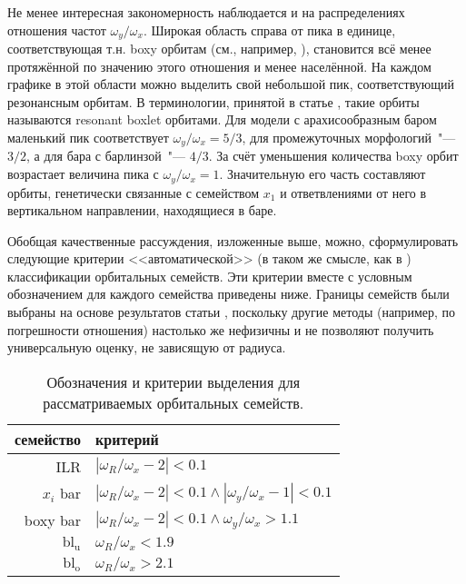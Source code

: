 \documentclass[tikz]{trlnotes}
\begin{document}
Не менее интересная закономерность наблюдается и на распределениях отношения частот $ω_y/ω_x$. Широкая область справа от пика в единице,
соответствующая т.н. boxy орбитам (см., например, \citealp{valluri2016}), становится всё менее протяжённой по значению этого отношения и менее населённой. На каждом графике в этой области
можно выделить свой небольшой пик, соответствующий резонансным орбитам. В терминологии, принятой в статье \citet{valluri2016}, такие орбиты
называются resonant boxlet орбитами. Для модели с арахисообразным баром маленький пик соответствует $ω_y/ω_x=5/3$, для промежуточных морфологий~"--- $3/2$, а для бара с барлинзой~"--- $4/3$.
За счёт уменьшения количества boxy орбит возрастает величина пика с $ω_y/ω_x = 1$. Значительную его часть
составляют орбиты, генетически связанные с семейством $x_1$ и ответвлениями от него в вертикальном направлении, находящиеся в баре.

Обобщая качественные рассуждения, изложенные выше, можно,  сформулировать следующие критерии <<автоматической>> (в
таком же смысле, как в \cite{valluri2016}) классификации орбитальных семейств. Эти критерии вместе с условным обозначением для каждого семейства приведены ниже.
Границы семейств были выбраны на основе результатов статьи \citet{portail2015}, поскольку другие методы (например, по погрешности отношения) настолько же нефизичны и не позволяют получить универсальную оценку, не зависящую от радиуса.
\begin{table}[htpb]
    \centering
  \begin{tabular}{r|l}
    \toprule
    {семейство}   & критерий \\
    \midrule
    ILR & $|ω_R/ω_x - 2| < 0.1$ \\
    $x_i$ bar & $|ω_R/ω_x - 2| < 0.1 \land |ω_y/ω_x - 1| < 0.1$ \\
    boxy bar  & $|ω_R/ω_x - 2| < 0.1 \land  ω_y/ω_x > 1.1$ \\
    $\text{bl}_\text{u}$  & $ω_R/ω_x < 1.9$ \\
    $\text{bl}_\text{o}$  & $ω_R/ω_x > 2.1$ \\
    \bottomrule
  \end{tabular}
  \caption{Обозначения и критерии выделения для рассматриваемых орбитальных семейств.}
  \label{tab:orbfamiles}
\end{table}
\end{document}
